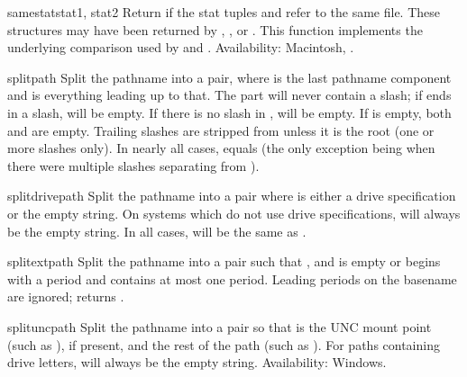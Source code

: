 \begin{funcdesc}{samestat}{stat1, stat2}
Return  if the stat tuples  and  refer to
the same file.  These structures may have been returned by
, , or .  This
function implements the underlying comparison used by
 and .
Availability:  Macintosh, \UNIX.
\end{funcdesc}

\begin{funcdesc}{split}{path}
Split the pathname  into a pair,  where  is the last pathname component and
 is everything leading up to that.  The  part will
never contain a slash; if  ends in a slash,  will
be empty.  If there is no slash in ,  will be
empty.  If  is empty, both  and  are
empty.  Trailing slashes are stripped from  unless it is the
root (one or more slashes only).  In nearly all cases,
 equals  (the only
exception being when there were multiple slashes separating 
from ).
\end{funcdesc}

\begin{funcdesc}{splitdrive}{path}
Split the pathname  into a pair  where  is either a drive specification or the
empty string.  On systems which do not use drive specifications,
 will always be the empty string.  In all cases,
 will be the same as .
\end{funcdesc}

\begin{funcdesc}{splitext}{path}
Split the pathname  into a pair  
such that ,
and  is empty or begins with a period and contains
at most one period. Leading periods on the basename are 
ignored;  returns 
.

\end{funcdesc}

\begin{funcdesc}{splitunc}{path}
Split the pathname  into a pair 
so that  is the UNC mount point (such as ),
if present, and  the rest of the path (such as 
).  For paths containing drive letters, 
will always be the empty string.
Availability:  Windows.
\end{funcdesc}

